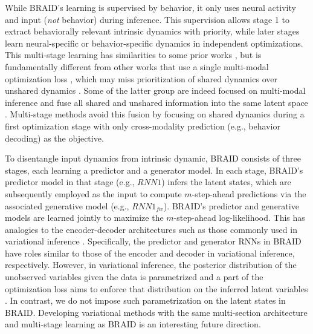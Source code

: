\documentclass{article} %
\newcommand{\RNN}[1]{\(\textit{RNN#1}\)} %
\newcommand{\RNNfw}[1]{\(\textit{RNN#1}_{fw}\)}
\newcommand{\ourmethod}{BRAID}
\begin{document}
While \ourmethod{}'s learning is supervised by behavior, it only uses neural activity and input (\textit{not} behavior) during inference. This supervision allows stage 1 to extract behaviorally relevant intrinsic dynamics with priority, while later stages learn neural-specific or behavior-specific dynamics in independent optimizations. This multi-stage learning has similarities to some prior works \citep{sani2021modeling,vahidi2024modeling,sani2024dissociative, oganesian2025spectral}, but is fundamentally different from other works that use a single multi-modal optimization loss \citep{kramer2022, gondur2024multi,hurwitz2021targeted}, which may miss prioritization of shared dynamics over unshared dynamics \citep{sani2024dissociative}. Some of the latter group are indeed focused on multi-modal inference and fuse all shared and unshared information into the same latent space \citep{kramer2022, gondur2024multi}. Multi-stage methods avoid this fusion by focusing on shared dynamics during a first optimization stage with only cross-modality prediction (e.g., behavior decoding) as the objective. 

To disentangle input dynamics from intrinsic dynamic, \ourmethod{} consists of three stages, each learning a predictor and a generator model. In each stage, \ourmethod{'s predictor model in that stage (e.g., \RNN{1}) infers the latent states, which are subsequently employed as the input to compute $m$-step-ahead predictions via the associated generative model (e.g., \RNNfw{1}). \ourmethod{}'s predictor and generative models are learned jointly to maximize the $m$-step-ahead log-likelihood. This has analogies to the encoder-decoder architectures such as those commonly used in variational inference \citep{kingma2013auto}. Specifically, the predictor and generator RNNs in \ourmethod{} have roles similar to those of the encoder and decoder in variational inference, respectively. However, in variational inference, the posterior distribution of the unobserved variables given the data is parametrized and a part of the optimization loss aims to enforce that distribution on the inferred latent variables \citep{chung2015recurrent, krishnan2015deepkalmanfilters, fraccaro2016sequential, luk2024learningoptimalfiltersusing}. In contrast, we do not impose such parametrization on the latent states in \ourmethod{}. Developing variational methods with the same multi-section architecture and multi-stage learning as \ourmethod{} is an interesting future direction.}
\end{document}
